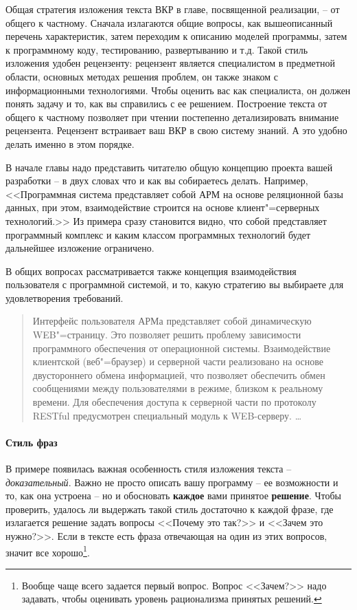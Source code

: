 \documentclass[a4paper,14pt,final]{extreport}
\begin{document}
Общая стратегия изложения текста ВКР в главе, посвященной реализации, -- от общего к частному.  Сначала излагаются общие вопросы, как вышеописанный перечень характеристик, затем переходим к описанию моделей программы, затем к программному коду, тестированию, развертыванию и т.д.  Такой стиль изложения удобен рецензенту: рецензент является специалистом в предметной области, основных методах решения проблем, он также знаком с информационными технологиями.  Чтобы оценить вас как специалиста, он должен понять задачу и то, как вы справились с ее решением.  Построение текста от общего к частному позволяет при чтении постепенно детализировать внимание рецензента.  Рецензент встраивает ваш ВКР в свою систему знаний.  А это удобно делать именно в этом порядке.

В начале главы надо представить читателю общую концепцию проекта вашей разработки -- в двух словах что и как вы собираетесь делать.  Например, <<Программная система представляет собой АРМ на основе реляционной базы данных, при этом, взаимодействие строится на основе клиент"=серверных технологий.>>  Из примера сразу становится видно, что собой представляет программный комплекс и каким классом программных технологий будет дальнейшее изложение ограничено.

В общих вопросах рассматривается также концепция взаимодействия пользователя с программной системой, и то, какую стратегию вы выбираете для удовлетворения требований.
\begin{quote}
  Интерфейс пользователя АРМа представляет собой динамическую WEB"=страницу.  Это позволяет решить проблему зависимости программного обеспечения от операционной системы.  Взаимодействие клиентской (веб"=браузер) и серверной части реализовано на основе двустороннего обмена информацией, что позволяет обеспечить обмен сообщениями между пользователями в режиме, близком к реальному времени.  Для обеспечения доступа к серверной части по протоколу RESTful предусмотрен специальный модуль к WEB-серверу. \ldots{}
\end{quote}

\paragraph{Стиль фраз}

В примере появилась важная особенность стиля изложения текста -- \emph{доказательный}.  Важно не просто описать вашу программу -- ее возможности и то, как она устроена -- но и обосновать \textbf{каждое} вами принятое \textbf{решение}.  Чтобы проверить, удалось ли выдержать такой стиль достаточно к каждой фразе, где излагается решение задать вопросы <<Почему это так?>> и <<Зачем это нужно?>>.  Если в тексте есть фраза отвечающая на один из этих вопросов, значит все хорошо\footnote{Вообще чаще всего задается первый вопрос.  Вопрос <<Зачем?>> надо задавать, чтобы оценивать уровень рационализма принятых решений.}.
\end{document}
